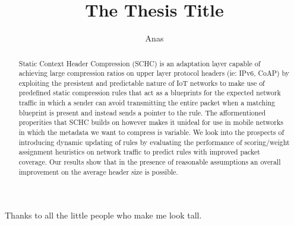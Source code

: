 \documentclass[12pt]{dalthesis}
\begin{document}
\title{The Thesis Title}
\author{Anas}

\bcshon  %





\nolistoftables
\nolistoffigures

\frontmatter

\begin{abstract}
	Static Context Header Compression (SCHC) is an adaptation layer
		capable of achieving large compression ratios on upper layer protocol headers (ie: IPv6, CoAP) by exploiting the presistent and predictable nature of 
		IoT networks to make use of predefined static compression rules that act as a blueprints for the 
		expected network traffic in which a sender can avoid transmitting the entire packet when a matching blueprint is present and instead sends a pointer to the rule. The 
		afformentioned properities that SCHC builds on however makes it unideal for use in mobile networks in which the metadata we want to compress is variable.
		We look into the prospects of introducing dynamic updating of rules by evaluating the performance of scoring/weight assignment heuristics on
		network traffic to predict rules with improved packet coverage. Our results show that in the presence of reasonable assumptions an overall 
		improvement on the average header size is possible.\cite{latex-by-lamport} 

\end{abstract}

\begin{acknowledgements}
Thanks to all the little people who make me look tall.
\end{acknowledgements}
\end{document}
